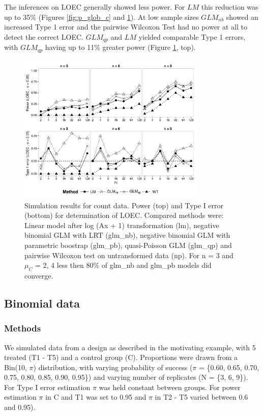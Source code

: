 \documentclass{scrartcl}
\begin{document}
The inferences on LOEC generally showed less power.
For $LM$ this reduction was up to 35\% (Figures \ref{fig:p_glob_c} and \ref{fig:p_loec_c}).
At low sample sizes $GLM_{nb}$ showed an increased Type 1 error and the pairwise Wilcoxon Test had no power at all to detect the correct LOEC.
$GLM_{qp}$ and $LM$ yielded comparable Type 1 errors, with $GLM_{qp}$ having up to 11\% greater power (Figure \ref{fig:p_loec_c}, top).

\begin{figure}
  \centering
  \includegraphics[width = 0.8\textwidth]{p_loec_c.pdf}
  \caption{Simulation results for count data. Power (top) and Type I error (bottom) for determination of LOEC. Compared methods were: Linear model after log (Ax + 1) transformation (lm), negative binomial GLM with LRT (glm\_nb), negative binomial GLM with parametric boostrap (glm\_pb), quasi-Poisson GLM (glm\_qp) and pairwise Wilcoxon test on untransformed data (np). For n = 3 and $\mu_C$ = {2, 4} less then 80\% of glm\_nb and glm\_pb models did converge.}
  \label{fig:p_loec_c}
\end{figure}



\subsection{Binomial data}
\subsubsection{Methods}
We simulated data from a design as described in the motivating example, with 5 treated (T1 - T5) and a control group (C). 
Proportions were drawn from a Bin(10, $\pi$) distribution, with varying probability of success ($\pi$ = \{0.60, 0.65, 0.70, 0.75, 0.80, 0.85, 0.90, 0.95\}) and varying number of replicates (N = \{3, 6, 9\}).
For Type I error estimation $\pi$ was held constant between groups.
For power estimation $\pi$ in C and T1 was set to 0.95 and $\pi$ in T2 - T5 varied between 0.6 and 0.95). 
 
\end{document}
